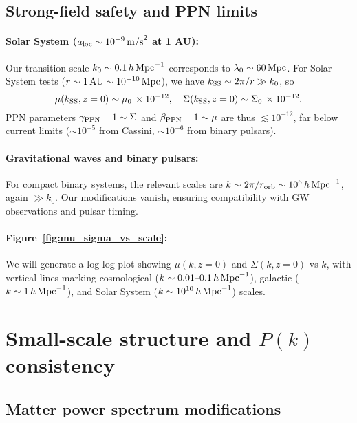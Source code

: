 \documentclass[11pt]{article}
\begin{document}
\subsection{Strong-field safety and PPN limits}

\paragraph{Solar System ($a_{\rm loc} \sim 10^{-9}\,{\rm m/s}^2$ at 1 AU):}
Our transition scale $k_0\sim 0.1\,h\,{\rm Mpc}^{-1}$ corresponds to $\lambda_0\sim 60\,{\rm Mpc}$.
For Solar System tests ($r\sim 1\,{\rm AU}\sim 10^{-10}\,{\rm Mpc}$), we have $k_{\rm SS}\sim 2\pi/r \gg k_0$, so
\begin{equation}
\mu(k_{\rm SS},z=0) \sim \mu_0\,\times 10^{-12}, 
\quad
\Sigma(k_{\rm SS},z=0) \sim \Sigma_0\,\times 10^{-12}.
\end{equation}
PPN parameters $\gamma_{\rm PPN}-1 \sim \Sigma$ and $\beta_{\rm PPN}-1 \sim \mu$ are thus $\lesssim 10^{-12}$, far below current limits ($\sim 10^{-5}$ from Cassini, $\sim 10^{-6}$ from binary pulsars).

\paragraph{Gravitational waves and binary pulsars:}
For compact binary systems, the relevant scales are $k\sim 2\pi/r_{\rm orb} \sim 10^{6}\,h\,{\rm Mpc}^{-1}$, again $\gg k_0$.
Our modifications vanish, ensuring compatibility with GW observations and pulsar timing.

\paragraph{Figure~\ref{fig:mu_sigma_vs_scale}:}
We will generate a log-log plot showing $\mu(k,z=0)$ and $\Sigma(k,z=0)$ vs $k$, with vertical lines marking cosmological ($k\sim 0.01\text{--}0.1\,h\,{\rm Mpc}^{-1}$), galactic ($k\sim 1\,h\,{\rm Mpc}^{-1}$), and Solar System ($k\sim 10^{10}\,h\,{\rm Mpc}^{-1}$) scales.

\section{Small-scale structure and $P(k)$ consistency}
\label{sec:pk_consistency}

\subsection{Matter power spectrum modifications}
\end{document}
